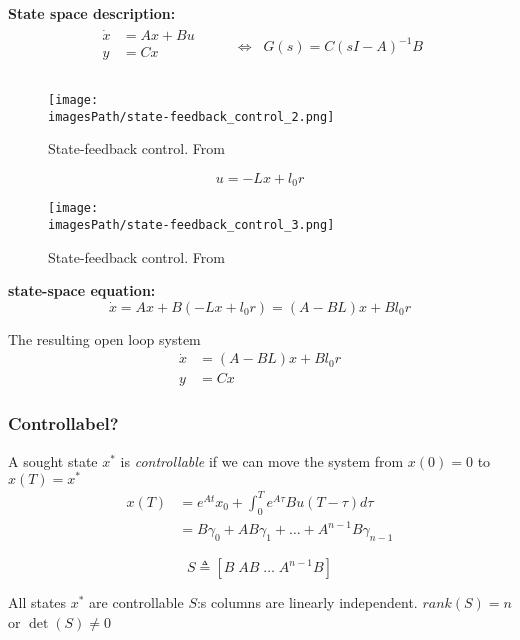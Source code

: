 \textbf{State space description:}
\begin{align*}
    \begin{aligned}
        \dot{x} &= Ax + Bu \\
        y &= Cx \\
    \end{aligned}&
    && \Leftrightarrow \;\; G(s) = C(sI-A)^{-1}B \\
\end{align*}
\begin{figure}[!h]
    \centering
    \texttt{[image: \\imagesPath/state-feedback\_control\_2.png]}
    \caption{State-feedback control. From \cite{}}
\end{figure}

\begin{equation*}
    u = -Lx + l_0 r
\end{equation*}
\begin{figure}[!h]
    \centering
    \texttt{[image: \\imagesPath/state-feedback\_control\_3.png]}
    \caption{State-feedback control. From \cite{}}
\end{figure}

\textbf{state-space equation:}
\begin{equation*}
    \dot{x} = Ax + B(-Lx+l_0r) = (A-BL)x + Bl_0r
\end{equation*}

The resulting open loop system
\begin{align*}
    \dot{x} &= (A-BL)x + Bl_0r \\
    y &= Cx
\end{align*}

\subsubsection{Controllabel?}
A sought state $x^*$ is \textit{controllable} if we can move the system from $x(0)=0$
to $x(T) = x^*$
\begin{align*}
    x(T) &= e^{At}x_0 + \int_0^T e^{A\tau}Bu(T-\tau)d\tau \\ 
    &= B\gamma_0 + AB\gamma_1 + \ldots + A^{n-1}B\gamma_{n-1}
\end{align*}

\begin{equation*}
    S \triangleq [B \; AB \; \ldots \; A^{n-1}B]
\end{equation*}

All states $x^*$ are controllable $S$:s columns are linearly independent.
$rank(S) = n$ or $\det(S) \neq 0$

